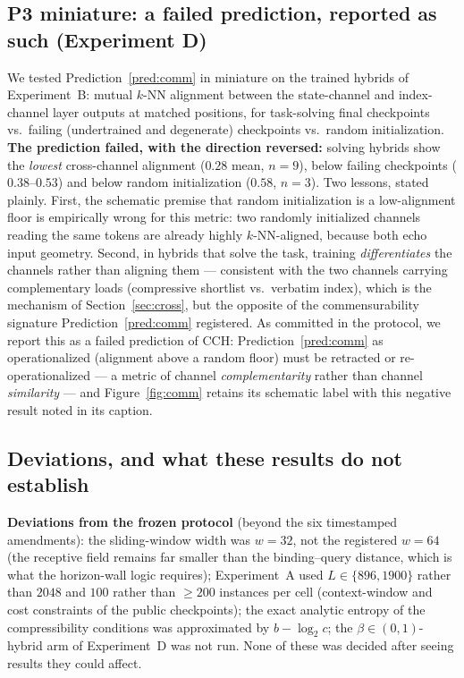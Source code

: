 \subsection{P3 miniature: a failed prediction, reported as such
(Experiment D)}
\label{sec:expD}

We tested Prediction~\ref{pred:comm} in miniature on the trained hybrids of
Experiment~B: mutual $k$-NN alignment between the state-channel and
index-channel layer outputs at matched positions, for task-solving final
checkpoints vs.\ failing (undertrained and degenerate) checkpoints vs.\ random
initialization. \textbf{The prediction failed, with the direction reversed:}
solving hybrids show the \emph{lowest} cross-channel alignment
($0.28$ mean, $n{=}9$), below failing checkpoints ($0.38$--$0.53$) and below
random initialization ($0.58$, $n{=}3$). Two lessons, stated plainly. First,
the schematic premise that random initialization is a low-alignment floor is
empirically wrong for this metric: two randomly initialized channels reading
the same tokens are already highly $k$-NN-aligned, because both echo input
geometry. Second, in hybrids that solve the task, training \emph{differentiates}
the channels rather than aligning them --- consistent with the two channels
carrying complementary loads (compressive shortlist vs.\ verbatim index), which
is the mechanism of Section~\ref{sec:cross}, but the opposite of the
commensurability signature Prediction~\ref{pred:comm} registered. As committed
in the protocol, we report this as a failed prediction of CCH:
Prediction~\ref{pred:comm} as operationalized (alignment above a random floor)
must be retracted or re-operationalized --- a metric of channel
\emph{complementarity} rather than channel \emph{similarity} --- and
Figure~\ref{fig:comm} retains its schematic label with this negative result
noted in its caption.

\subsection{Deviations, and what these results do not establish}
\label{sec:exp-honesty}

\textbf{Deviations from the frozen protocol} (beyond the six timestamped
amendments): the sliding-window width was $w{=}32$, not the registered
$w{=}64$ (the receptive field remains far smaller than the binding--query
distance, which is what the horizon-wall logic requires); Experiment~A used
$L\in\{896,1900\}$ rather than $2048$ and $100$ rather than $\ge 200$ instances
per cell (context-window and cost constraints of the public checkpoints); the
exact analytic entropy of the compressibility conditions was approximated by
$b-\log_2 c$; the $\beta\in(0,1)$-hybrid arm of Experiment~D was not run.
None of these was decided after seeing results they could affect.

